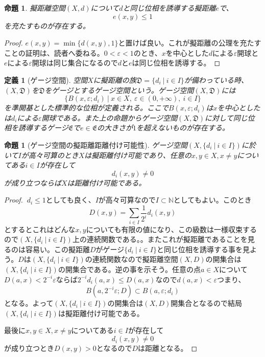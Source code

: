 \documentclass[leqno]{jsarticle}
\newtheorem{prop}[thm]{命題}
\newtheorem{df}[thm]{定義}
\newcommand{\nn}{\mathbb{N}}
\newcommand{\mgn}{\infty}
\newcommand{\ep}{\varepsilon}
\begin{document}
\begin{prop}
擬距離空間$(X,d)$について$d$と同じ位相を誘導する擬距離$e$で、
\[
e(x,y)\le1
\]
を充たすものが存在する。
\end{prop}
\begin{proof}
$e(x,y)=\min\{d(x,y),1\}$と置けば良い。これが擬距離の公理を充たすことの証明は、読者へ委ねる。$0<\ep<1$のとき、$x$を中心とした$d$による$\ep$開球と$e$による$\ep$開球は同じ集合になるので$d$と$e$は同じ位相を誘導する。
\end{proof}

\begin{df}[ゲージ空間]
空間$X$に擬距離の族$\mathfrak{D}=\{d_{i}\ |\ i\in I\}$が備わっている時、$(X,\mathfrak{D})$を$\mathfrak{D}$をゲージとするゲージ空間という。ゲージ空間$(X,\mathfrak{D})$には
\[
\{B(x,\ep;d_i)\ |\ x\in X,\ \ep\in (0,+\mgn), \ i\in I\}
\]
を準開基とした標準的な位相が定義される。ここで$B(x,\ep;d_i)$は$x$を中心としたは$d_i$による$\ep$開球である。また上の命題からゲージ空間$(X,\mathfrak{D})$に対して同じ位相を誘導するゲージ$\mathfrak{E}$で$e\in \mathfrak{E}$の大きさが$1$を超えないものが存在する。
\end{df}
\begin{prop}[ゲージ空間の擬距離距離付け可能性]\label{metric}
ゲージ空間$(X,\{d_{i}\ |\ i\in I\})$に於いて$I$が高々可算のとき$X$は擬距離付け可能であり、任意の$x,y\in X,x\neq y$についてある$i\in I$が存在して
\[
d_i(x,y)\neq0
\]
が成り立つならば$X$は距離付け可能である。
\end{prop}
\begin{proof}
$\ d_i\le 1$としても良く、$I$が高々可算なので$I\subset \nn$としてもよい。このとき
\[
D(x,y)=\sum_{i\in I}\frac{1}{2^{i}}d_i(x,y)
\]
とするとこれはどんな$x,y$についても有限の値になり、この級数は一様収束するので$(X,\{d_{i}\ |\ i\in I\})$上の連続関数である。。またこれが擬距離であることを見るのは容易い。この擬距離$D$がゲージ$\{d_{i}\ |\ i\in I\}$と同じ位相を誘導する事を見よう。$D$は$(X,\{d_{i}\ |\ i\in I\})$の連続関数なので擬距離空間$(X,D)$の開集合は$(X,\{d_{i}\ |\ i\in I\})$の開集合である。逆の事を示そう。任意の点$a\in X$について$D(a,x)<2^{-i}\ep$ならば$2^{-i}d_i(a,x)\le D(a,x)$なので$d(a,x)<\ep$つまり、
\[
B(a,2^{-i}\ep;D)\subset B(a,\ep;d_i)
\]
となる。よって$(X,\{d_{i}\ |\ i\in I\})$の開集合は$(X,D)$開集合となるので結局$(X,\{d_{i}\ |\ i\in I\})$は擬距離付け可能である。\par
最後に$x,y\in X,x\neq y$についてある$i\in I$が存在して
\[
d_i(x,y)\neq0
\]
が成り立つとき$D(x,y)>0$となるので$D$は距離となる。
\end{proof}
\end{document}
